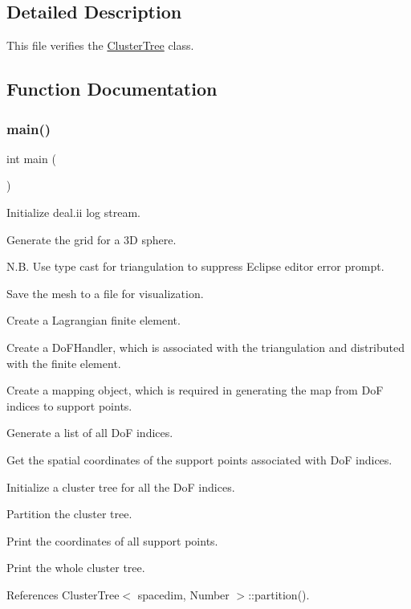 \subsection{Detailed Description}
This file verifies the \hyperlink{classClusterTree}{Cluster\+Tree} class. 

\subsection{Function Documentation}
\mbox{\label{cluster-tree_8cc_ae66f6b31b5ad750f1fe042a706a4e3d4}} 
\subsubsection{\texorpdfstring{main()}{main()}}
{\footnotesize\ttfamily int main (\begin{DoxyParamCaption}{ }\end{DoxyParamCaption})}

Initialize deal.\+ii log stream.

Generate the grid for a 3D sphere.

N.\+B. Use type cast for triangulation to suppress Eclipse editor error prompt.

Save the mesh to a file for visualization.

Create a Lagrangian finite element.

Create a Do\+F\+Handler, which is associated with the triangulation and distributed with the finite element.

Create a mapping object, which is required in generating the map from DoF indices to support points.

Generate a list of all DoF indices.

Get the spatial coordinates of the support points associated with DoF indices.

Initialize a cluster tree for all the DoF indices.

Partition the cluster tree.

Print the coordinates of all support points.

Print the whole cluster tree.

References Cluster\+Tree$<$ spacedim, Number $>$\+::partition().

